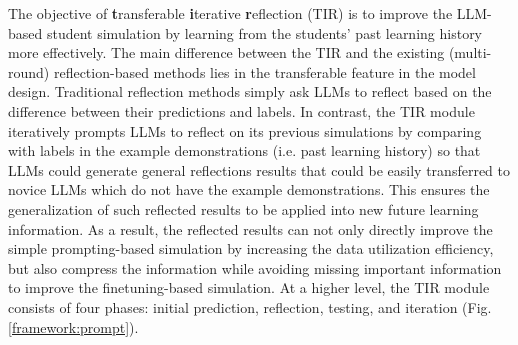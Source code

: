 The objective of \textbf{t}ransferable \textbf{i}terative \textbf{r}eflection (TIR) is to improve the LLM-based student simulation by learning from the students' past learning history more effectively. 
The main difference between the TIR and the existing (multi-round) reflection-based methods \cite{madaan2024self,ji2023towards,yan2024mirror,kumar2024supporting,hui2024rot,wang2024taste,li2024think} lies in the transferable feature in the model design. Traditional reflection methods simply ask LLMs to reflect based on the difference between their predictions and labels. 
In contrast, the TIR module iteratively prompts LLMs to reflect on its previous simulations by comparing with labels in the example demonstrations (i.e. past learning history) so that LLMs could generate general reflections results that could be easily 
transferred to novice LLMs which do not have the example demonstrations. This ensures the generalization of such reflected results to be applied into 
new future learning information. As a result, the reflected results can not only directly improve the simple prompting-based simulation by increasing the data utilization efficiency, but also compress the information while avoiding missing important information 
to improve the finetuning-based simulation.
%
At a higher level, the TIR module consists of four phases: initial prediction, reflection, testing, and iteration 
(Fig. \ref{framework:prompt}). 

